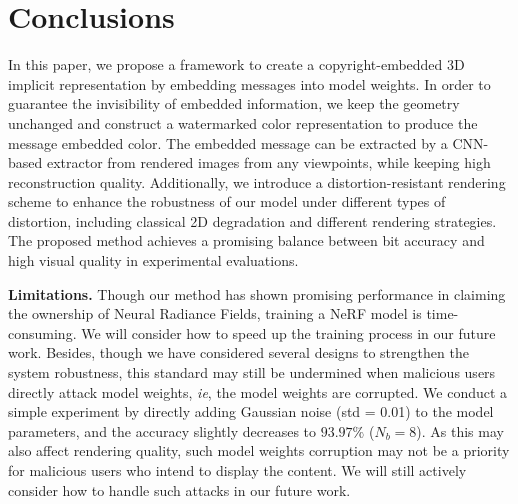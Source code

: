 \documentclass[10pt,twocolumn,letterpaper]{article}
\begin{document}
\section{Conclusions}

In this paper, we propose a framework to create a copyright-embedded 3D implicit representation by embedding messages into model weights. In order to guarantee the invisibility of embedded information, we keep the geometry unchanged and construct a watermarked color representation to produce the message embedded color. The embedded message can be extracted by a CNN-based extractor from rendered images from any viewpoints, while keeping high reconstruction quality. Additionally, we introduce a distortion-resistant rendering scheme to enhance the robustness of our model under different types of distortion, including classical 2D degradation and different rendering strategies. The proposed method achieves a promising balance between bit accuracy and high visual quality in experimental evaluations.

\noindent\textbf{Limitations.} Though our method has shown promising performance in claiming the ownership of Neural Radiance Fields,  
training a NeRF model is time-consuming. We will consider how to speed up the training process in our future work. Besides, though we have considered several designs to strengthen the system robustness, this standard may still be undermined when malicious users directly attack model weights, \textit{ie}, the model weights are corrupted. We conduct a simple experiment by directly adding Gaussian noise (std = 0.01) to the model parameters, and the accuracy slightly decreases to $93.97\%$ ($N_b = 8$). As this may also affect rendering quality, such model weights corruption may not be a priority for malicious users who intend to display the content. We will still actively consider how to handle such attacks in our future work. 
 
\end{document}
